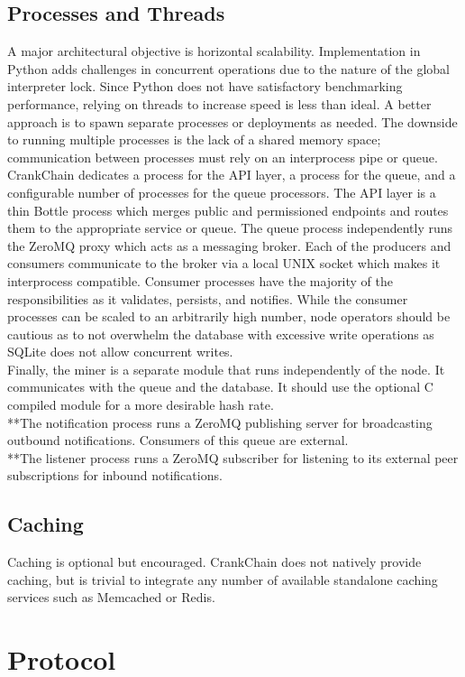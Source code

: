 \documentclass[10pt,twocolumn]{article}
\begin{document}
\subsection{Processes and Threads}
A major architectural objective is horizontal scalability.  Implementation in Python adds challenges in concurrent operations due to the nature of the global interpreter lock.  Since Python does not have satisfactory benchmarking performance, relying on threads to increase speed is less than ideal.  A better approach is to spawn separate processes or deployments as needed.  The downside to running multiple processes is the lack of a shared memory space; communication between processes must rely on an interprocess pipe or queue.  CrankChain dedicates a process for the API layer, a process for the queue, and a configurable number of processes for the queue processors.  The API layer is a thin Bottle process which merges public and permissioned endpoints and routes them to the appropriate service or queue.  The queue process independently runs the ZeroMQ proxy which acts as a messaging broker.  Each of the producers and consumers communicate to the broker via a local UNIX socket which makes it interprocess compatible.  Consumer processes have the majority of the responsibilities as it validates, persists, and notifies.  While the consumer processes can be scaled to an arbitrarily high number, node operators should be cautious as to not overwhelm the database with excessive write operations as SQLite does not allow concurrent writes.\\  
Finally, the miner is a separate module that runs independently of the node.  It communicates with the queue and the database.  It should use the optional C compiled module for a more desirable hash rate.\\
**The notification process runs a ZeroMQ publishing server for broadcasting outbound notifications.  Consumers of this queue are external.\\
**The listener process runs a ZeroMQ subscriber for listening to its external peer subscriptions for inbound notifications.
\subsection{Caching}
Caching is optional but encouraged.  CrankChain does not natively provide caching, but is trivial to integrate any number of available standalone caching services such as Memcached or Redis.  


\section{Protocol}
\end{document}
